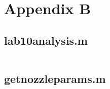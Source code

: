 \chapter{Appendix B}

\section{lab10analysis.m} \label{sec:analysis_code}

\inputminted{matlab}{Code/lab10analysis.m} \label{listing:data_analysis_script}

\section{getnozzleparams.m} \label{sec:helper_function}

\inputminted{matlab}{Code/getnozzleparams.m} \label{listing:helper_function_script}